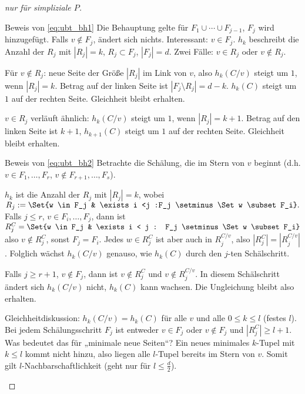 \begin{thm}
\begin{proof}[nur für simpliziale $P$]
\begin{seg}{Beweis von \eqref{eq:ubt_bh1}}
            Die Behauptung gelte für $F_1 \cup \dotsb \cup F_{j-1}$, $F_j$ wird hinzugefügt.
            Falls $v \not\in F_j$, ändert sich nichts.
            Interessant: $v \in F_j$.
            $h_k$ beschreibt die Anzahl der $R_j$ mit $|R_j| = k$, $R_j \subset F_j$, $|F_j| = d$.
            Zwei Fälle: $v \in R_j$ oder $v \not\in R_j$.

            Für $v \not\in R_j$: neue Seite der Größe $|R_j|$ im Link von $v$, also $h_k(C/v)$ steigt um $1$, wenn $|R_j| = k$.
            Betrag auf der linken Seite ist $|F_j \setminus R_j| = d - k$.
            $h_k(C)$ steigt um $1$ auf der rechten Seite.
            Gleichheit bleibt erhalten.

            $v \in R_j$ verläuft ähnlich: $h_k(C/v)$ steigt um $1$, wenn $|R_j| = k + 1$.
            Betrag auf den linken Seite ist $k+1$, $h_{k+1}(C)$ steigt um $1$ auf der rechten Seite.
            Gleichheit bleibt erhalten.
        \end{seg}
        \begin{seg}{Beweis von \eqref{eq:ubt_bh2}}
            Betrachte die Schälung, die im Stern von $v$ beginnt (d.h. $v \in F_1, \dotsc, F_r$, $v \not\in F_{r+1}, \dotsc, F_s$).

            $h_k$ ist die Anzahl der $R_j$ mit $|R_j| = k$, wobei
            \begin{math}
                R_j := \Set{w \in F_j & \exists i <j :F_j \setminus \Set w \subset F_i}.
            \end{math}
            Falls $j \le r$, $v \in F_i, \dotsc, F_j$, dann ist
            \begin{math}
                R_j^C = \Set{w \in F_j & \exists i < j : F_j \setminus \Set w \subset F_i}
            \end{math}
            also $v \not\in R_j^C$, sonst $F_j = F_i$.
            Jedes $w \in R_j^C$ ist aber auch in $R_j^{C/v}$, also $|R_j^C| = |R_j^{C/v}|$.
            Folglich wächst $h_k(C/v)$ genauso, wie $h_k(C)$ durch den $j$-ten Schälschritt.

            Falls $j \ge r + 1$, $v \not\in F_j$, dann ist $v \not\in R_j^C$ und $v \not\in R_j^{C/v}$.
            In diesem Schälschritt ändert sich $h_k(C/v)$ nicht, $h_k(C)$ kann wachsen.
            Die Ungleichung bleibt also erhalten.

            Gleichheitdiskussion: $h_k(C/v) = h_k(C)$ für alle $v$ und alle $0 \le k \le l$ (festes $l$).
            Bei jedem Schälungsschritt $F_j$ ist entweder $v \in F_j$ oder $v \not\in F_j$ und $|R_j^C| \ge l + 1$.
            Was bedeutet das für „minimale neue Seiten“?
            Ein neues minimales $k$-Tupel mit $k \le l$ kommt nicht hinzu, also liegen alle $l$-Tupel bereits im Stern von $v$.
            Somit gilt $l$-Nachbarschaftlichkeit (geht nur für $l \le \frac{d}{2}$).
        \end{seg}
    \end{proof}
\end{thm}

